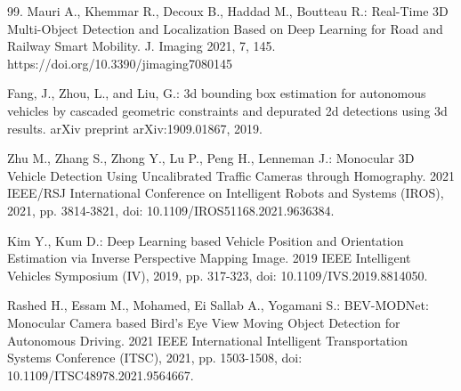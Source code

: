 \begin{thebibliography}{99.}
Mauri A., Khemmar R., Decoux B., Haddad M., Boutteau R.:
Real-Time 3D Multi-Object Detection and Localization Based on Deep Learning for Road and Railway Smart Mobility.
J. Imaging 2021, 7, 145. https://doi.org/10.3390/jimaging7080145

Fang, J., Zhou, L., and Liu, G.:
3d bounding box estimation for autonomous vehicles by cascaded geometric constraints and depurated 2d detections using 3d results.
arXiv preprint arXiv:1909.01867, 2019.

Zhu M., Zhang S., Zhong Y., Lu P., Peng H., Lenneman J.:
Monocular 3D Vehicle Detection Using Uncalibrated Traffic Cameras through Homography.
2021 IEEE/RSJ International Conference on Intelligent Robots and Systems (IROS), 2021, pp. 3814-3821, doi: 10.1109/IROS51168.2021.9636384.

Kim Y., Kum D.:
Deep Learning based Vehicle Position and Orientation Estimation via Inverse Perspective Mapping Image.
2019 IEEE Intelligent Vehicles Symposium (IV), 2019, pp. 317-323, doi: 10.1109/IVS.2019.8814050.

Rashed H., Essam M., Mohamed, Ei Sallab A., Yogamani S.:
BEV-MODNet: Monocular Camera based Bird's Eye View Moving Object Detection for Autonomous Driving.
2021 IEEE International Intelligent Transportation Systems Conference (ITSC), 2021, pp. 1503-1508, doi: 10.1109/ITSC48978.2021.9564667.
%
\end{thebibliography}
